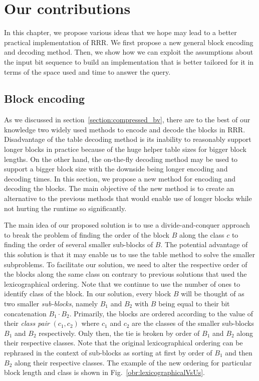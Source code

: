 \chapter{Our contributions}
\label{kap:kap3}

In this chapter, we propose various ideas that we hope may lead to a better practical
implementation of RRR. We first propose a new general block encoding and decoding method.
Then, we show how we can exploit the assumptions about the input bit sequence to build
an implementation that is better tailored for it in terms of the space used and time to
answer the query.

\section{Block encoding}

As we discussed in section~\ref{section:compressed_bv}, there are to
the best of our knowledge two widely used methods to encode and decode the
blocks in RRR. Disadvantage of the table decoding method is its inability
to reasonably support longer blocks in practice because of the
huge helper table sizes for bigger block lengths. On the other hand, the on-the-fly
decoding method may be used to support a bigger block size with the downside
being longer encoding and decoding times. In this section, we propose a new
method for encoding and decoding the blocks. The main objective of the new
method is to create an alternative to the previous methods that would enable use
of longer blocks while not hurting the runtime so significantly.

The main idea of our proposed solution is to use a divide-and-conquer approach to
break the problem of finding the order of the block $B$ along the class $c$ to
finding the order of several smaller sub-blocks of $B$. The potential advantage of this
solution is that it may enable us to use the table method to solve the smaller
subproblems. To facilitate our solution, we need to alter the respective order
of the blocks along the same class on contrary to previous solutions that used the
lexicographical ordering. Note that we continue to use the number of ones to identify class of
the block. In our solution, every block $B$ will be thought of as two smaller \textit{sub-blocks},
namely $B_1$ and $B_2$ with $B$ being equal to their bit concatenation $B_1\cdot B_2$. Primarily,
the blocks are ordered according to the value of their \textit{class pair} $(c_1, c_2)$ where
$c_1$ and $c_2$ are the classes of the smaller sub-blocks $B_1$ and $B_2$ respectively. Only then,
the tie is broken by order of $B_1$ and $B_2$ along their respective classes. Note that the original
lexicographical ordering can be rephrased in the context of sub-blocks as sorting at first by order
of $B_1$ and then $B_2$ along their respective classes. The example of the new ordering for
particular block length and class is shown in Fig.~\ref{obr:lexicographicalVsUs}.

